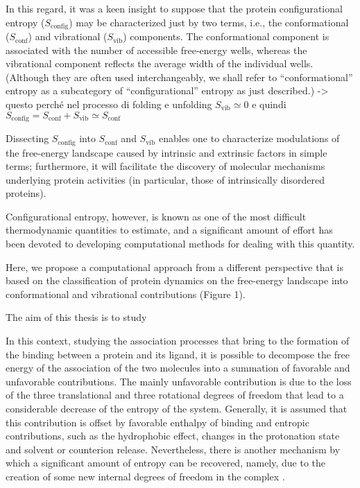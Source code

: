 \newpage

In this regard, it was a keen insight to suppose that the protein configurational entropy ($S_\text{config}$) may be characterized just by two terms, i.e., the conformational ($S_\text{conf}$) and vibrational ($S_\text{vib}$) components.
The conformational component is associated with the number of accessible free-energy wells, whereas the vibrational component reflects the average width of the individual wells. (Although they are often used interchangeably, we shall refer to ``conformational'' entropy as a subcategory of ``configurational'' entropy as just described.) -> questo perché nel processo di folding e unfolding $S_\text{vib} \simeq 0$ e quindi $S_\text{config} = S_\text{conf} + S_\text{vib} \simeq S_\text{conf}$

Dissecting $S_\text{config}$ into $S_\text{conf}$ and $S_\text{vib}$ enables one to characterize modulations of the free-energy landscape caused by intrinsic and extrinsic factors in simple terms; furthermore, it will facilitate the discovery of molecular mechanisms underlying protein activities (in particular, those of intrinsically disordered proteins).

Configurational entropy, however, is known as one of the most difficult thermodynamic quantities to estimate, and a significant amount of effort has been devoted to developing computational methods for dealing with this quantity. 

Here, we propose a computational approach from a different perspective that is based on the classification of protein
dynamics on the free-energy landscape into conformational and vibrational contributions (Figure 1). 


\cite{karplus1987configurational}

The aim of this thesis is to study 
\newpage

In this context, studying the association processes that bring to the formation of the binding between a protein and its ligand, it is possible to decompose the free energy of the association of the two molecules into a summation of favorable and unfavorable contributions. The mainly unfavorable contribution is due to the loss of the three translational and three rotational degrees of freedom that lead to a considerable decrease of the entropy of the system. Generally, it is assumed that this contribution is offset by favorable enthalpy of binding and entropic contributions, such as the hydrophobic effect, changes in the protonation state and solvent or counterion release. Nevertheless, there is another mechanism by which a significant amount of entropy can be recovered, namely, due to the creation of some new internal degrees of freedom in the complex \cite{tidor1994contribution}.

